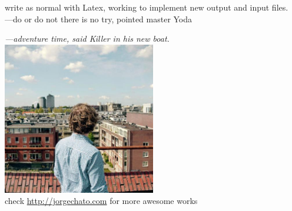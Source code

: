 write as normal with Latex, working to implement new output and input files.\\
---do or do not there is no try, pointed master Yoda\par
\textit{---adventure time, said Killer in his new boat.}\\
\includegraphics[width=0.5\textwidth,natwidth=512,natheight=512]{../images/0.jpg}\\
check \url{http://jorgechato.com} for more awesome works
